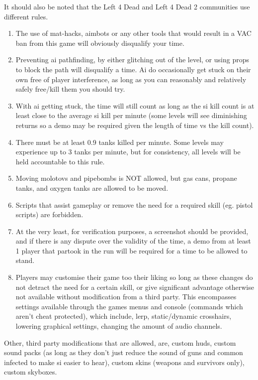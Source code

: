 It should also be noted that the Left 4 Dead and Left 4 Dead 2 communities use different rules.

\begin{enumerate}
\item The use of mat-hacks, aimbots or any other tools that would result in a VAC ban from this game will obviously disqualify your time.
\item  Preventing ai pathfinding, by either glitching out of the level, or using props to block the path will disqualify a time. Ai do occasionally get stuck on their own free of player interference, as long as you can reasonably and relatively safely free/kill them you should try.
\item  With ai getting stuck, the time will still count as long as the si kill count is at least close to the average si kill per minute (some levels will see diminishing returns so a demo may be required given the length of time vs the kill count).
\item  There must be at least 0.9 tanks killed per minute. Some levels may experience up to 3 tanks per minute, but for consistency, all levels will be held accountable to this rule.
\item Moving molotovs and pipebombs is NOT allowed, but gas cans, propane tanks, and oxygen tanks are allowed to be moved.
\item Scripts that assist gameplay or remove the need for a required skill (eg. pistol scripts) are forbidden.
\item At the very least, for verification purposes, a screenshot should be provided, and if there is any dispute over the validity of the time, a demo from at least 1 player that partook in the run will be required for a time to be allowed to stand.
\item Players may customise their game too their liking so long as these changes do not detract the need for a certain skill, or give significant advantage otherwise not available without modification from a third party. This encompasses settings available through the games menus and console (commands which aren't cheat protected), which include, lerp, static/dynamic crosshairs, lowering graphical settings, changing the amount of audio channels. 
\end{enumerate}

Other, third party modifications that are allowed, are, custom huds, custom sound packs (as long as they don't just reduce the sound of guns and common infected to make si easier to hear), custom skins (weapons and survivors only), custom skyboxes.


